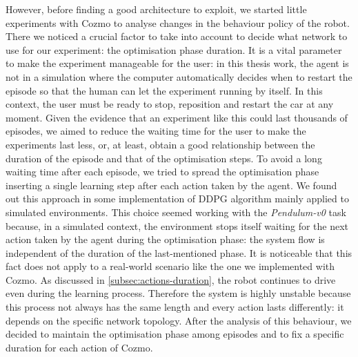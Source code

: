 However, before finding a good architecture to exploit, we started little experiments with Cozmo to analyse changes in the behaviour policy of the robot.
There we noticed a crucial factor to take into account to decide what network to use for our experiment: the optimisation phase duration.
It is a vital parameter to make the experiment manageable for the user: in this thesis work, the agent is not in a simulation where the computer automatically decides when to restart the episode so that the human can let the experiment running by itself.
In this context, the user must be ready to stop, reposition and restart the car at any moment.
Given the evidence that an experiment like this could last thousands of episodes, we aimed to reduce the waiting time for the user to make the experiments last less, or, at least, obtain a good relationship between the duration of the episode and that of the optimisation steps.
To avoid a long waiting time after each episode, we tried to spread the optimisation phase inserting a single learning step after each action taken by the agent.
We found out this approach in some implementation of DDPG algorithm mainly applied to simulated environments.
This choice seemed working with the \textit{Pendulum-v0} task because, in a simulated context, the environment stops itself waiting for the next action taken by the agent during the optimisation phase: the system flow is independent of the duration of the last-mentioned phase.
It is noticeable that this fact does not apply to a real-world scenario like the one we implemented with Cozmo.
As discussed in \vref{subsec:actions-duration}, the robot continues to drive even during the learning process.
Therefore the system is highly unstable because this process not always has the same length and every action lasts differently: it depends on the specific network topology.
After the analysis of this behaviour, we decided to maintain the optimisation phase among episodes and to fix a specific duration for each action of Cozmo.

